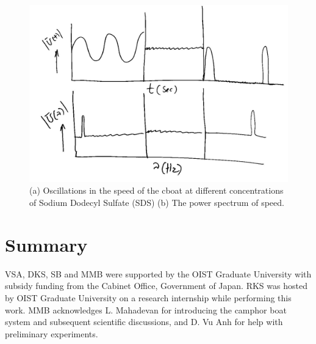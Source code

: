 \documentclass[aps,twocolumn, floatfix, superscriptaddress]{revtex4}
\begin{document}
\begin{figure}[ht]
    \begin{center}
       \includegraphics[scale=0.2]{figure6.jpg}
    \end{center}
    \caption{(a) Oscillations in the speed of the cboat at different concentrations of Sodium Dodecyl Sulfate (SDS) (b) The power spectrum of speed.}
    \label{fig:absvsds}
\end{figure}
\section{Summary}
\label{sec:summary}








\acknowledgments
VSA, DKS, SB and MMB were supported by the OIST Graduate University with subsidy funding from the Cabinet Office, Government of Japan. RKS was hosted by OIST Graduate University on a research internship while performing this work. MMB acknowledges L. Mahadevan for introducing the camphor boat system and subsequent scientific discussions, and D. Vu Anh for help with preliminary experiments.


\end{document}

